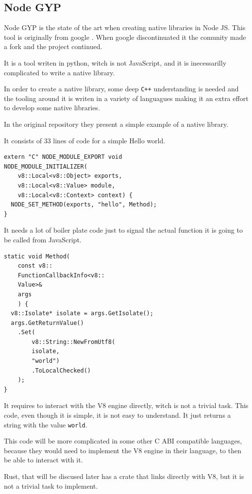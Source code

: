 \documentclass[10pt,journal,compsoc]{IEEEtran}
\begin{document}
\subsection{Node GYP}

Node GYP is the state of the art when creating native libraries in Node JS. This tool is originally from google \cite{FKNODE}. When google discontinuated it the comunity made a fork and the project continued. \cite{NODEGYP}

It is a tool writen in python, witch is not JavaScript, and it is inecessarilly complicated to write a native library.

In order to create a native library, some deep \verb|C++| understanding is needed and the tooling around it is writen in a variety of languagues making it an extra effort to develop some native libraries.

In the original repository they present a simple example of a native library. \cite{NODEGYP}

It consists of 33 lines of code for a simple Hello world.

\begin{lstlisting}
extern "C" NODE_MODULE_EXPORT void
NODE_MODULE_INITIALIZER(
    v8::Local<v8::Object> exports,
    v8::Local<v8::Value> module,
    v8::Local<v8::Context> context) {
  NODE_SET_METHOD(exports, "hello", Method);
}
\end{lstlisting}

It needs a lot of boiler plate code just to signal the actual function it is going to be called from JavaScript.

\begin{lstlisting}
static void Method(
    const v8::
    FunctionCallbackInfo<v8::
    Value>& 
    args
    ) {
  v8::Isolate* isolate = args.GetIsolate();
  args.GetReturnValue()
    .Set(
        v8::String::NewFromUtf8(
        isolate, 
        "world")
        .ToLocalChecked()
    );
}
\end{lstlisting}

It requires to interact with the V8 engine directly, witch is not a trivial task. This code, even though it is simple, it is not easy to understand. It just returns a string with the value \verb|world|.

This code will be more complicated in some other C ABI compatible languages, because they would need to implement the V8 engine in their language, to then be able to interact with it.

Rust, that will be discused later has a crate that links directly with V8, but it is not a trivial task to implement.
\end{document}
